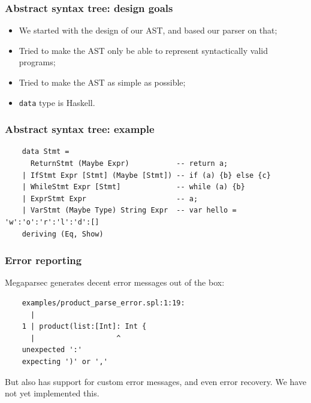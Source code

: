\documentclass{beamer}
\begin{document}

\begin{frame}
  \frametitle{Abstract syntax tree: design goals}

  \begin{itemize}[<+->]
    \item We started with the design of our AST, and based our parser on that;
    \item Tried to make the AST only be able to represent syntactically valid programs;
    \item Tried to make the AST as simple as possible;
    \item \texttt{data} type is Haskell.
  \end{itemize}
\end{frame}

\begin{frame}[fragile]
  \frametitle{Abstract syntax tree: example}

  \begin{verbatim}
    data Stmt =
      ReturnStmt (Maybe Expr)           -- return a;
    | IfStmt Expr [Stmt] (Maybe [Stmt]) -- if (a) {b} else {c}
    | WhileStmt Expr [Stmt]             -- while (a) {b}
    | ExprStmt Expr                     -- a;
    | VarStmt (Maybe Type) String Expr  -- var hello = 'w':'o':'r':'l':'d':[]
    deriving (Eq, Show)
  \end{verbatim}
\end{frame}


\begin{frame}[fragile]
  \frametitle{Error reporting}

  Megaparsec generates decent error messages out of the box:

  \begin{verbatim}
    examples/product_parse_error.spl:1:19:
      |
    1 | product(list:[Int]: Int {
      |                   ^
    unexpected ':'
    expecting ')' or ','
  \end{verbatim}

  But also has support for custom error messages, and even error recovery. We have not yet implemented this.
\end{frame}
\end{document}

